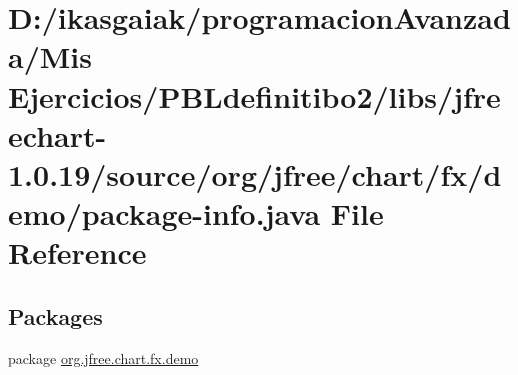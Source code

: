 \hypertarget{demo_2package-info_8java}{}\section{D\+:/ikasgaiak/programacion\+Avanzada/\+Mis Ejercicios/\+P\+B\+Ldefinitibo2/libs/jfreechart-\/1.0.19/source/org/jfree/chart/fx/demo/package-\/info.java File Reference}
\label{demo_2package-info_8java}
\subsection*{Packages}
\begin{DoxyCompactItemize}
\item 
package \mbox{\hyperlink{namespaceorg_1_1jfree_1_1chart_1_1fx_1_1demo}{org.\+jfree.\+chart.\+fx.\+demo}}
\end{DoxyCompactItemize}

